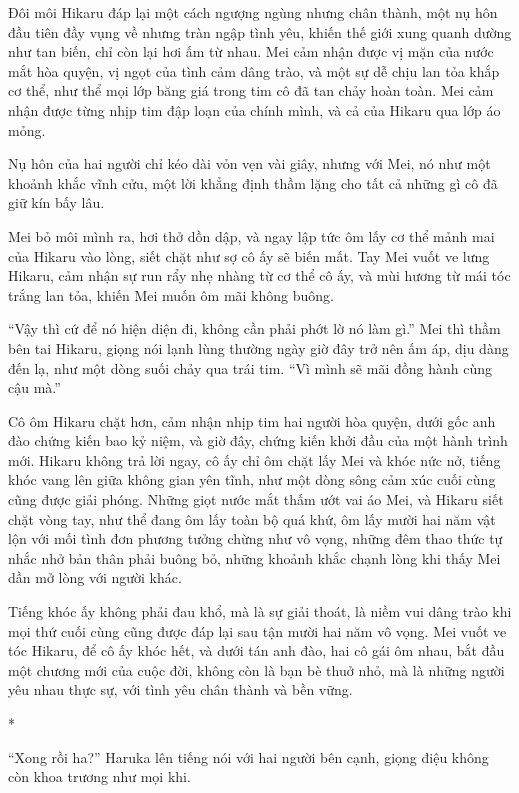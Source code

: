{Đôi môi Hikaru đáp lại một cách ngượng ngùng nhưng chân thành, một nụ
hôn đầu tiên đầy vụng về nhưng tràn ngập tình yêu, khiến thế giới xung
quanh dường như tan biến, chỉ còn lại hơi ấm từ nhau. Mei cảm nhận được
vị mặn của nước mắt hòa quyện, vị ngọt của tình cảm dâng trào, và một sự
dễ chịu lan tỏa khắp cơ thể, như thể mọi lớp băng giá trong tim cô đã
tan chảy hoàn toàn. Mei cảm nhận được từng nhịp tim đập loạn của chính
mình, và cả của Hikaru qua lớp áo mỏng.

Nụ hôn của hai người chỉ kéo dài vỏn vẹn vài giây, nhưng với Mei, nó như
một khoảnh khắc vĩnh cửu, một lời khẳng định thầm lặng cho tất cả những
gì cô đã giữ kín bấy lâu.

Mei bỏ môi mình ra, hơi thở dồn dập, và ngay lập tức ôm lấy cơ thể mảnh
mai của Hikaru vào lòng, siết chặt như sợ cô ấy sẽ biến mất. Tay Mei
vuốt ve lưng Hikaru, cảm nhận sự run rẩy nhẹ nhàng từ cơ thể cô ấy, và
mùi hương từ mái tóc trắng lan tỏa, khiến Mei muốn ôm mãi không buông.

``Vậy thì cứ để nó hiện diện đi, không cần phải phớt lờ nó làm gì.'' Mei
thì thầm bên tai Hikaru, giọng nói lạnh lùng thường ngày giờ đây trở nên
ấm áp, dịu dàng đến lạ, như một dòng suối chảy qua trái tim. ``Vì mình
sẽ mãi đồng hành cùng cậu mà.''

Cô ôm Hikaru chặt hơn, cảm nhận nhịp tim hai người hòa quyện, dưới gốc
anh đào chứng kiến bao kỷ niệm, và giờ đây, chứng kiến khởi đầu của một
hành trình mới. Hikaru không trả lời ngay, cô ấy chỉ ôm chặt lấy Mei và
khóc nức nở, tiếng khóc vang lên giữa không gian yên tĩnh, như một dòng
sông cảm xúc cuối cùng cũng được giải phóng. Những giọt nước mắt thấm
ướt vai áo Mei, và Hikaru siết chặt vòng tay, như thể đang ôm lấy toàn
bộ quá khứ, ôm lấy mười hai năm vật lộn với mối tình đơn phương tưởng
chừng như vô vọng, những đêm thao thức tự nhắc nhở bản thân phải buông
bỏ, những khoảnh khắc chạnh lòng khi thấy Mei dần mở lòng với người
khác.

Tiếng khóc ấy không phải đau khổ, mà là sự giải thoát, là niềm vui dâng
trào khi mọi thứ cuối cùng cũng được đáp lại sau tận mười hai năm vô
vọng. Mei vuốt ve tóc Hikaru, để cô ấy khóc hết, và dưới tán anh đào,
hai cô gái ôm nhau, bắt đầu một chương mới của cuộc đời, không còn là
bạn bè thuở nhỏ, mà là những người yêu nhau thực sự, với tình yêu chân
thành và bền vững.

*

``Xong rồi ha?'' Haruka lên tiếng nói với hai người bên cạnh, giọng điệu
không còn khoa trương như mọi khi.

}
